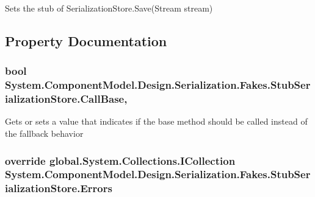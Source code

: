 Sets the stub of Serialization\-Store.\-Save(\-Stream stream)



\subsection{Property Documentation}
\hypertarget{class_system_1_1_component_model_1_1_design_1_1_serialization_1_1_fakes_1_1_stub_serialization_store_aadb331ad8d68b2036c5426a0ceeab994}{
\subsubsection[{Call\-Base}]{\setlength{\rightskip}{0pt plus 5cm}bool System.\-Component\-Model.\-Design.\-Serialization.\-Fakes.\-Stub\-Serialization\-Store.\-Call\-Base\hspace{0.3cm}{\ttfamily [get]}, {\ttfamily [set]}}}\label{class_system_1_1_component_model_1_1_design_1_1_serialization_1_1_fakes_1_1_stub_serialization_store_aadb331ad8d68b2036c5426a0ceeab994}


Gets or sets a value that indicates if the base method should be called instead of the fallback behavior

\hypertarget{class_system_1_1_component_model_1_1_design_1_1_serialization_1_1_fakes_1_1_stub_serialization_store_ae9b04ea3115a80886da9468075f57859}{
\subsubsection[{Errors}]{\setlength{\rightskip}{0pt plus 5cm}override global.\-System.\-Collections.\-I\-Collection System.\-Component\-Model.\-Design.\-Serialization.\-Fakes.\-Stub\-Serialization\-Store.\-Errors\hspace{0.3cm}{\ttfamily [get]}}}\label{class_system_1_1_component_model_1_1_design_1_1_serialization_1_1_fakes_1_1_stub_serialization_store_ae9b04ea3115a80886da9468075f57859}


